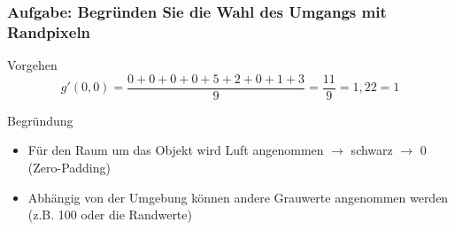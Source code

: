 \documentclass[aspectratio=169]{beamer}
\begin{document}
\begin{frame}
\begin{columns}
\begin{column}{0.5\textwidth}
\begin{alertblock}
    \end{alertblock}
    \end{column}
    \end{columns}
\end{frame}

\begin{frame}
    \frametitle{Aufgabe: Begründen Sie die Wahl des Umgangs mit Randpixeln}
    \begin{alertblock}
        {Vorgehen}
        \begin{equation}
            g'(0,0) = \frac{0+0+0+0+5+2+0+1+3}{9} = \frac{11}{9} = 1,22 = 1
        \end{equation}
    \end{alertblock}
    \begin{alertblock}
        {Begründung}
        \begin{itemize}
            \item Für den Raum um das Objekt wird Luft angenommen $\rightarrow$ schwarz $\rightarrow$ 0 (Zero-Padding)
            \item Abhängig von der Umgebung können andere Grauwerte angenommen werden (z.B. 100 oder die Randwerte)
        \end{itemize}
    \end{alertblock}
\end{frame}
\end{document}
